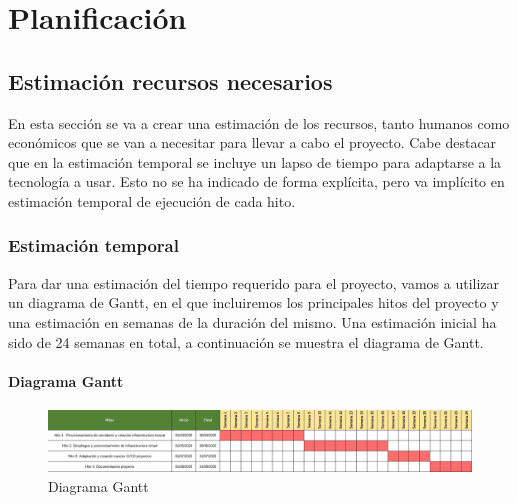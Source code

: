 \chapter {Planificación}

\section{Estimación recursos necesarios}
\begin{text}
	En esta sección se va a crear una estimación de los recursos, tanto humanos como económicos que se van a necesitar para llevar a cabo el proyecto. Cabe destacar que en la estimación temporal se incluye un lapso de tiempo para adaptarse a la tecnología a usar. Esto no se ha indicado de forma explícita, pero va implícito en estimación temporal de ejecución de cada hito. \\ 
	
\end{text}
\subsection{Estimación temporal}
\begin{text}
	Para dar una estimación del tiempo requerido para el proyecto, vamos a utilizar un diagrama de Gantt, en el que incluiremos los principales hitos del proyecto y una estimación en semanas de la duración del mismo. Una estimación inicial ha sido de 24 semanas en total, a continuación se muestra el diagrama de Gantt.
\end{text}

\newpage
\subsubsection{Diagrama Gantt}
	\begin{figure}[!hbt]
		\centering
		\includegraphics[scale=0.4,angle=-90]{imagenes/Planificacion/gantt.jpg}
		\caption[Diagrama Gantt]{Diagrama Gantt \cite{Gantt:online}} 
		\label{Diagrama Gannt}
	\end{figure}
\clearpage
